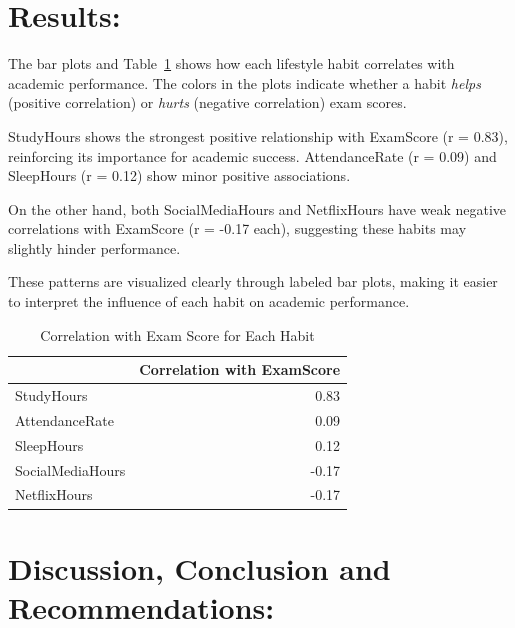 \documentclass[
  11pt,
  a4paper,
]{article}
\begin{document}
\newpage

\section{Results:}\label{results}

The bar plots and
Table~\ref{tbl-correlation-with-exam-score-for-each-habit} shows how
each lifestyle habit correlates with academic performance. The colors in
the plots indicate whether a habit \emph{helps} (positive correlation)
or \emph{hurts} (negative correlation) exam scores.

StudyHours shows the strongest positive relationship with ExamScore (r =
0.83), reinforcing its importance for academic success. AttendanceRate
(r = 0.09) and SleepHours (r = 0.12) show minor positive associations.

On the other hand, both SocialMediaHours and NetflixHours have weak
negative correlations with ExamScore (r = -0.17 each), suggesting these
habits may slightly hinder performance.

These patterns are visualized clearly through labeled bar plots, making
it easier to interpret the influence of each habit on academic
performance.

\begin{longtable}[]{@{}lr@{}}

\caption{\label{tbl-correlation-with-exam-score-for-each-habit}Correlation
with Exam Score for Each Habit}

\tabularnewline

\toprule\noalign{}
& Correlation with ExamScore \\
\midrule\noalign{}
\endhead
\bottomrule\noalign{}
\endlastfoot
StudyHours & 0.83 \\
AttendanceRate & 0.09 \\
SleepHours & 0.12 \\
SocialMediaHours & -0.17 \\
NetflixHours & -0.17 \\

\end{longtable}

\newpage

\section{Discussion, Conclusion and
Recommendations:}\label{discussion-conclusion-and-recommendations}
\end{document}
